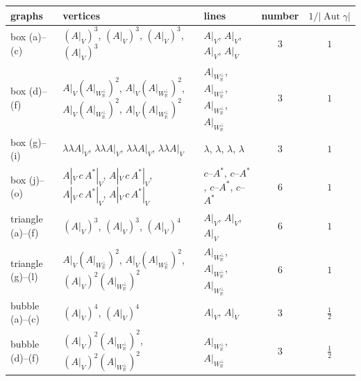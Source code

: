 


\begin{tabular}{l|l|l|c|c}
graphs & vertices & lines & number & $1/|\operatorname{Aut}\gamma|$ \\
\hline
box (a)--(c) & $(A|_V)^3$, $(A|_V)^3$, $(A|_V)^3$, $(A|_V)^3$ & $A|_V$, $A|_V$, $A|_V$, $A|_V$ & $3$ & $1$ \\
box (d)--(f) & $A|_V(A|_{W_{\mathbb R}^\perp})^2$, $A|_V(A|_{W_{\mathbb R}^\perp})^2$, $A|_V(A|_{W_{\mathbb R}^\perp})^2$, $A|_V(A|_{W_{\mathbb R}^\perp})^2$ & $A|_{W_{\mathbb R}^\perp}$, $A|_{W_{\mathbb R}^\perp}$, $A|_{W_{\mathbb R}^\perp}$, $A|_{W_{\mathbb R}^\perp}$ & $3$ & $1$ \\
box (g)--(i) & $\lambda\lambda A|_V$, $\lambda\lambda A|_V$, $\lambda\lambda A|_V$, $\lambda\lambda A|_V$ & $\lambda$, $\lambda$, $\lambda$, $\lambda$ & $3$ & $1$ \\
box (j)--(o) & $A|_V\,c\,A^*|_V$, $A|_V\,c\,A^*|_V$, $A|_V\,c\,A^*|_V$, $A|_V\,c\,A^*|_V$ & $c$--$A^*$, $c$--$A^*$, $c$--$A^*$, $c$--$A^*$ & $6$ & $1$ \\
triangle (a)--(f) & $(A|_V)^3$, $(A|_V)^3$, $(A|_V)^4$ & $A|_V$, $A|_V$, $A|_V$ & $6$ & $1$ \\
triangle (g)--(l) & $A|_V(A|_{W_{\mathbb R}^\perp})^2$, $A|_V(A|_{W_{\mathbb R}^\perp})^2$, $(A|_V)^2(A|_{W_{\mathbb R}^\perp})^2$ & $A|_{W_{\mathbb R}^\perp}$, $A|_{W_{\mathbb R}^\perp}$, $A|_{W_{\mathbb R}^\perp}$ & $6$ & $1$ \\
bubble (a)--(c) & $(A|_V)^4$, $(A|_V)^4$ & $A|_V$, $A|_V$ & $3$ & $\tfrac12$ \\
bubble (d)--(f) & $(A|_V)^2(A|_{W_{\mathbb R}^\perp})^2$, $(A|_V)^2(A|_{W_{\mathbb R}^\perp})^2$ & $A|_{W_{\mathbb R}^\perp}$, $A|_{W_{\mathbb R}^\perp}$ & $3$ & $\tfrac12$ \\
\end{tabular}


